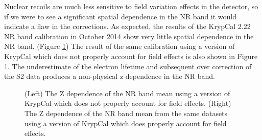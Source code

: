 \documentclass[a4paper,12pt]{article}
\begin{document}
{Nuclear recoils are much less sensitive to field variation effects in the detector, so if we were to see a significant spatial dependence in the NR band it would indicate a flaw in the corrections. As expected, the results of the KrypCal 2.22 NR band calibration in October 2014 show very little spatial dependence in the NR band. (Figure \ref{NRBandZ})  The result of the same calibration using a version of KrypCal which does not properly account for field effects is also shown in Figure \ref{NRBandZ}.  The underestimate of the electron lifetime and subsequent over correction of the S2 data produces a non-physical z dependence in the NR band.


\begin{figure} [h!]
\centering
{}
\qquad
{}
\caption{ (Left) The Z dependence of the NR band mean using a version of KrypCal which does not properly account for field effects. (Right) The Z dependence of the NR band mean from the same datasets using a version of KrypCal which does properly account for field effects.  }
\label{NRBandZ}
\end{figure}



}
\end{document}
